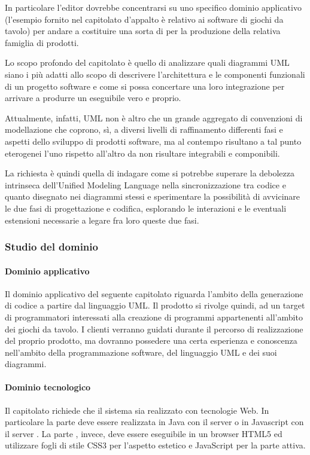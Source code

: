 		In particolare l'editor dovrebbe concentrarsi su uno specifico dominio applicativo (l'esempio fornito nel capitolato d'appalto è relativo ai software di giochi da tavolo) per andare a costituire una sorta di  per la produzione della relativa famiglia di prodotti.

		Lo scopo profondo del capitolato è quello di analizzare quali diagrammi UML siano i più adatti allo scopo di descrivere l'architettura 
		e le componenti funzionali di un progetto software e come si possa concertare una loro integrazione per arrivare a produrre un eseguibile vero e proprio. 

		Attualmente, infatti, UML non è altro che un grande aggregato di convenzioni di modellazione che coprono, sì, a diversi livelli di raffinamento differenti fasi e aspetti dello sviluppo di prodotti software, ma al contempo risultano a tal punto eterogenei l'uno rispetto all'altro da non risultare integrabili e componibili. 

		La richiesta è quindi quella di indagare come si potrebbe superare la debolezza intrinseca dell'Unified Modeling Language nella sincronizzazione tra codice e quanto disegnato nei diagrammi stessi e sperimentare la possibilità di avvicinare le due fasi di progettazione e codifica, esplorando le interazioni e le eventuali estensioni necessarie a legare fra loro queste due fasi.
		\subsubsection{Studio del dominio}
			\paragraph{Dominio applicativo} Il dominio applicativo del seguente capitolato riguarda l'ambito della generazione di codice a partire dal linguaggio UML. Il prodotto si rivolge quindi, ad un target di programmatori interessati alla creazione di programmi appartenenti all'ambito dei giochi da tavolo. I clienti verranno guidati durante il percorso di realizzazione del proprio prodotto, ma dovranno possedere una certa esperienza e conoscenza nell'ambito della programmazione software, del linguaggio UML e dei suoi diagrammi.
			
			\paragraph{Dominio tecnologico}
			Il capitolato richiede che il sistema sia realizzato con tecnologie Web. In particolare la parte  deve essere realizzata in Java con il server 
			 o in Javascript con il server . La parte , invece, deve essere eseguibile in un browser HTML5 ed utilizzare fogli di stile CSS3 per l'aspetto estetico e JavaScript per la parte attiva.
		
